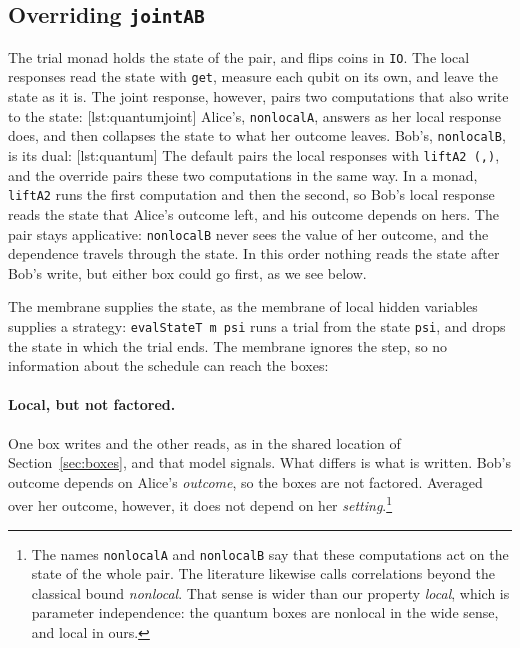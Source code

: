 \documentclass[11pt]{article}
\newcommand{\hs}{\lstinline[style=hask,basicstyle=\ttfamily,frame=none]}
\begin{document}
\subsection{Overriding \texttt{jointAB}}\label{sec:override}

The trial monad holds the state of the pair, and flips coins in \hs|IO|. The local responses read the state with \hs|get|, measure each qubit on its own, and leave the state as it is. The joint response, however, pairs two computations that also write to the state:
[lst:quantumjoint]
Alice's, \hs|nonlocalA|, answers as her local response does, and then collapses the state to what her outcome leaves. Bob's, \hs|nonlocalB|, is its dual:
[lst:quantum]
The default pairs the local responses with \hs|liftA2 (,)|, and the override pairs these two computations in the same way. In a monad, \hs|liftA2| runs the first computation and then the second, so Bob's local response reads the state that Alice's outcome left, and his outcome depends on hers. The pair stays applicative: \hs|nonlocalB| never sees the value of her outcome, and the dependence travels through the state. In this order nothing reads the state after Bob's write, but either box could go first, as we see below.

The membrane supplies the state, as the membrane of local hidden variables supplies a strategy: \hs|evalStateT m psi| runs a trial from the state \hs|psi|, and drops the state in which the trial ends. The membrane ignores the step, so no information about the schedule can reach the boxes:

\paragraph{Local, but not factored.} One box writes and the other reads, as in the shared location of Section~\ref{sec:boxes}, and that model signals. What differs is what is written. Bob's outcome depends on Alice's \emph{outcome}, so the boxes are not factored. Averaged over her outcome, however, it does not depend on her \emph{setting}.\footnote{The names \hs|nonlocalA| and \hs|nonlocalB| say that these computations act on the state of the whole pair. The literature likewise calls correlations beyond the classical bound \emph{nonlocal}. That sense is wider than our property \emph{local}, which is parameter independence: the quantum boxes are nonlocal in the wide sense, and local in ours.}
\end{document}
